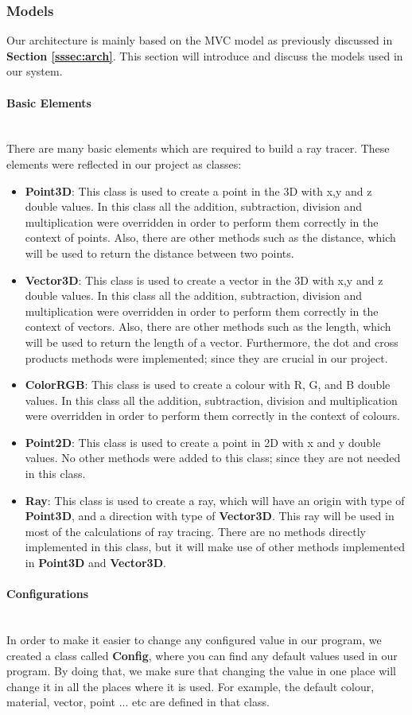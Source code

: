 \documentclass[a4paper]{article}
\newcommand{
	\subsubsubsection}[1]
{\paragraph{#1}\mbox{}\\[.35em]}
\begin{document}
	\subsubsection{Models}
	Our architecture is mainly based on the MVC model as previously discussed in \textbf{Section \ref{sssec:arch}}. This section will introduce and discuss the models used in our system.
	\subsubsubsection{Basic Elements}
	There are many basic elements which are required to build a ray tracer. These elements were reflected in our project as classes: 
	\begin{itemize}
		\item \textbf{Point3D}: This class is used to create a point in the 3D with x,y and z double values. In this class all the addition, subtraction, division and multiplication were overridden in order to perform them correctly in the context of points. Also, there are other methods such as the distance, which will be used to return the distance between two points.
		\item \textbf{Vector3D}: This class is used to create a vector in the 3D with x,y and z double values. In this class all the addition, subtraction, division and multiplication were overridden in order to perform them correctly in the context of vectors. Also, there are other methods such as the length, which will be used to return the length of a vector. Furthermore, the dot and cross products methods were implemented; since they are crucial in our project.
		\item \textbf{ColorRGB}: This class is used to create a colour with R, G, and B double values. In this class all the addition, subtraction, division and multiplication were overridden in order to perform them correctly in the context of colours.
		\item \textbf{Point2D}: This class is used to create a point in 2D with x and y double values. No other methods were added to this class; since they are not needed in this class.
		\item \textbf{Ray}: This class is used to create a ray, which will have an origin with type of \textbf{Point3D}, and a direction with type of \textbf{Vector3D}. This ray will be used in most of the calculations of ray tracing. There are no methods directly implemented in this class, but it will make use of other methods implemented in \textbf{Point3D} and \textbf{Vector3D}.
	\end{itemize}
	\subsubsubsection{Configurations}
	In order to make it easier to change any configured value in our program, we created a class called \textbf{Config}, where you can find any default values used in our program. By doing that, we make sure that changing the value in one place will change it in all the places where it is used. For example, the default colour, material, vector, point ... etc are defined in that class. 
\end{document}
